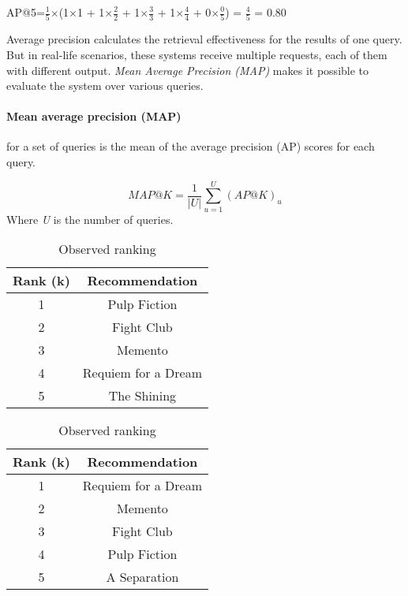 AP@5=$\frac{1}{5}$$\times$(1$\times$1 + 1$\times$$\frac{2}{2}$ + 1$\times$$\frac{3}{3}$ + 1$\times$$\frac{4}{4}$ + 0$\times$$\frac{0}{5}$) = $\frac{4}{5}$ = 0.80

Average precision calculates the retrieval effectiveness for the results of one query. But in real-life scenarios, these systems receive multiple requests, each of them with different output. \emph{Mean Average Precision (MAP)} makes it possible to evaluate the system over various queries.

\paragraph*{Mean average precision (MAP)} for a set of queries is the mean of the average precision (AP) scores for each query.

\begin{equation}
    MAP@K = \frac{1}{|U|}\sum_{u=1}^{U}(AP@K)_{u}
    \label{eq:map@k}
\end{equation}
Where \emph{U} is the number of queries.

\begin{table}[!ht]
    \caption{Comparing results of objective and observed ranking}
    \label{tab:apk-example}
    \begin{subtable}{.5\linewidth}
        \caption{Objective ranking}
        \centering
        \begin{tabular}{c|c}
            \textbf{Rank (k)}&\textbf{Recommendation} \\
            \hline
            1 & Pulp Fiction \\
            2 & Fight Club \\
            3 & Memento \\
            4 & Requiem for a Dream \\
            5 & The Shining \\
        \end{tabular}
    \end{subtable}%
    \begin{subtable}{.5\linewidth}
        \caption{Observed ranking}
        \centering
        \begin{tabular}{c|c}
            \textbf{Rank (k)}&\textbf{Recommendation} \\
            \hline
            1 & Requiem for a Dream \\
            2 & Memento \\
            3 & Fight Club \\
            4 & Pulp Fiction \\
            5 & A Separation  \\
        \end{tabular}
    \end{subtable}%
\end{table}

